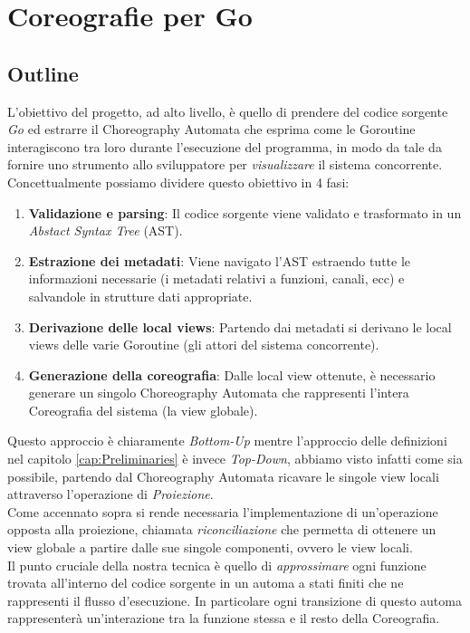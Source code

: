 \chapter{Coreografie per Go} 
\section{Outline} \label{sec:GoOutline}
L'obiettivo del progetto, ad alto livello, è quello di prendere del codice sorgente \emph{Go} ed estrarre il Choreography Automata che esprima come le Goroutine interagiscono tra loro durante l'esecuzione del programma, in modo da tale da fornire uno strumento allo sviluppatore per \emph{visualizzare} il sistema concorrente.\\
Concettualmente possiamo dividere questo obiettivo in 4 fasi:
\begin{enumerate}
    \item \textbf{Validazione e parsing}: Il codice sorgente viene validato e trasformato in un \emph{Abstact Syntax Tree} (AST).
    \item \textbf{Estrazione dei metadati}: Viene navigato l'AST estraendo tutte le informazioni necessarie (i metadati relativi a funzioni, canali, ecc) e salvandole in strutture dati appropriate.
    \item \textbf{Derivazione delle local views}: Partendo dai metadati si derivano le local views delle varie Goroutine (gli attori del sistema concorrente).
    \item \textbf{Generazione della coreografia}: Dalle local view ottenute, è necessario generare un singolo Choreography Automata che rappresenti l'intera Coreografia del sistema (la view globale).
\end{enumerate}
Questo approccio è chiaramente \emph{Bottom-Up} mentre l'approccio delle definizioni nel capitolo \ref{cap:Preliminaries} è invece \emph{Top-Down}, abbiamo visto infatti come sia possibile, partendo dal Choreography Automata ricavare le singole view locali attraverso l'operazione di \emph{Proiezione}.\\
Come accennato sopra si rende necessaria l'implementazione di un'operazione opposta alla proiezione, chiamata \emph{riconciliazione} che permetta di ottenere un view globale a partire dalle sue singole componenti, ovvero le view locali. \\
Il punto cruciale della nostra tecnica è quello di \emph{approssimare} ogni funzione trovata all'interno del codice sorgente in un automa a stati finiti che ne rappresenti il flusso d'esecuzione. In particolare ogni transizione di questo automa rappresenterà un'interazione tra la funzione stessa e il resto della Coreografia. \bigskip \\
